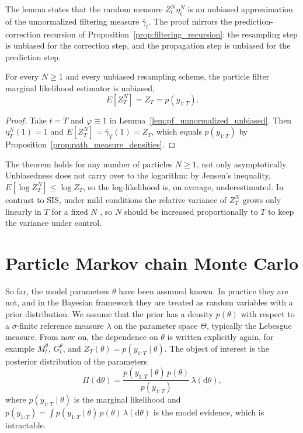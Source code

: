 The lemma states that the random measure $Z_t^N\eta_t^N$ is an unbiased approximation of the unnormalized filtering measure $\bar{\gamma}_t$. The proof mirrors the prediction-correction recursion of Proposition~\ref{prop:filtering_recursion}: the resampling step is unbiased for the correction step, and the propagation step is unbiased for the prediction step.

\begin{theorem}
    \label{thm:pf_marginal_likelihood_unbiased}
    For every $N\ge1$ and every unbiased resampling scheme, the particle filter marginal likelihood estimator is unbiased,
    \begin{equation}
        E\left[Z_T^N\right] = Z_T = p(y_{1:T}).
    \end{equation}
\end{theorem}
\begin{proof}
    Take $t=T$ and $\varphi\equiv1$ in Lemma~\ref{lem:pf_unnormalized_unbiased}. Then $\eta_T^N(1) = 1$ and $E[Z_T^N] = \bar{\gamma}_T(1) = Z_T$, which equals $p(y_{1:T})$ by Proposition~\ref{prop:path_measure_densities}.
\end{proof}

\begin{remark}
    The theorem holds for any number of particles $N\ge1$, not only asymptotically. Unbiasedness does not carry over to the logarithm: by Jensen's inequality, $E[\log Z_T^N]\le\log Z_T$, so the log-likelihood is, on average, underestimated. In contrast to SIS, under mild conditions the relative variance of $Z_T^N$ grows only linearly in $T$ for a fixed $N$ \cite{chopin2020smc}, so $N$ should be increased proportionally to $T$ to keep the variance under control.
\end{remark}

\section{Particle Markov chain Monte Carlo}
\label{sec:particle_mcmc}
So far, the model parameters $\theta$ have been assumed known. In practice they are not, and in the Bayesian framework they are treated as random variables with a prior distribution. We assume that the prior has a density $p(\theta)$ with respect to a $\sigma$-finite reference measure $\lambda$ on the parameter space $\Theta$, typically the Lebesgue measure. From now on, the dependence on $\theta$ is written explicitly again, for example $M_t^\theta$, $G_t^\theta$, and $Z_T(\theta) = p(y_{1:T}\mid\theta)$. The object of interest is the posterior distribution of the parameters
\begin{equation}
    \Pi(\mathrm{d}\theta) = \frac{p(y_{1:T}\mid\theta)\,p(\theta)}{p(y_{1:T})}\,\lambda(\mathrm{d}\theta),
    \label{eq:parameter_posterior}
\end{equation}
where $p(y_{1:T}\mid\theta)$ is the marginal likelihood and $p(y_{1:T}) = \int p(y_{1:T}\mid\theta)\,p(\theta)\,\lambda(\mathrm{d}\theta)$ is the model evidence, which is intractable.

